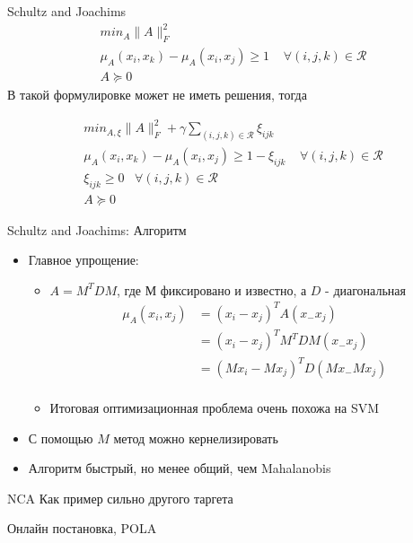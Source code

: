\documentclass[14pt, fleqn, xcolor={dvipsnames, table}]{beamer}
\begin{document}
\begin{frame}{Schultz and Joachims}
$$\begin{array}{l}
min_A \|A\|_{F}^2 \\
\mu_A(x_i, x_k) - \mu_{A}(x_i, x_j) \ge 1 \;\;\;\; \forall (i,j,k) \in \mathcal{R} \\
A \succeq 0
\end{array}$$
В такой формулировке может не иметь решения, тогда

$$\begin{array}{l}
min_{A, \xi} \|A\|_{F}^2 + \gamma \sum_{(i,j,k) \in \mathcal{R}} \xi_{ijk} \\
\mu_A(x_i, x_k) - \mu_{A}(x_i, x_j) \ge 1 - \xi_{ijk} \;\;\;\; \forall (i,j,k) \in \mathcal{R} \\
\xi_{ijk} \ge 0 \;\;\; \forall (i,j,k) \in \mathcal{R} \\
A \succeq 0
\end{array}$$

\end{frame}

\begin{frame}{Schultz and Joachims: Алгоритм}
\begin{itemize}
  \item Главное упрощение:
  \begin{itemize}
    \item $A = M^TDM$, где $М$ фиксировано и известно, а $D$ - диагональная
    $$\begin{array}{rl}
      \mu_A(x_i, x_j) &= (x_i - x_j)^TA(x_ - x_j) \\
      &= (x_i - x_j)^TM^TDM(x_ - x_j) \\
      &= (Mx_i - Mx_j)^TD(Mx_ - Mx_j) \\
\end{array}$$
    \item Итоговая оптимизационная проблема очень похожа на SVM

  \end{itemize}
  \item С помощью $M$ метод можно кернелизировать
  \item Алгоритм быстрый, но менее общий, чем Mahalanobis
\end{itemize}
\end{frame}

\begin{frame}{NCA}
Как пример сильно другого таргета
\end{frame}

\begin{frame}{Онлайн постановка, POLA}
\end{frame}
\end{document}

